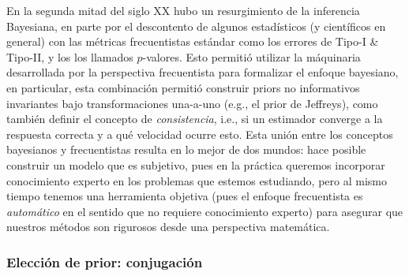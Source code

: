 En la segunda mitad del siglo XX hubo un resurgimiento de la inferencia Bayesiana, en parte por el descontento de algunos estadísticos (y científicos en general) con las métricas  frecuentistas estándar como los errores de Tipo-I \& Tipo-II, y los los llamados $p$-valores. Esto permitió utilizar la máquinaria desarrollada por la perspectiva frecuentista para formalizar el enfoque bayesiano, en particular, esta combinación permitió construir priors no informativos invariantes bajo transformaciones una-a-uno (e.g., el prior de Jeffreys), como también definir el concepto de \emph{consistencia}, i.e., si un estimador converge a la respuesta correcta y a qué velocidad ocurre esto. Esta unión entre los conceptos bayesianos y frecuentistas resulta en lo mejor de dos mundos: hace posible construir un modelo que es subjetivo, pues en la práctica queremos incorporar conocimiento experto en los problemas que estemos estudiando, pero al mismo tiempo tenemos una herramienta objetiva (pues el enfoque frecuentista es \emph{automático} en el sentido que no requiere conocimiento experto) para asegurar que nuestros métodos son rigurosos desde una perspectiva matemática. 


\subsubsection{Elección de prior: conjugación}
\label{ssub:reg_lin_bayes}

